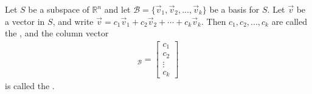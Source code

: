 \documentclass{article}
\begin{document}
\begin{definition}
    Let $S$ be a subspace of $\mathbb{R}^n$ and let $\mathcal{B}=\{\vec v_1, \vec v_2, ..., \vec v_k\}$ be a basis for $S$. Let $\vec v$ be a vector in $S$, and write $\vec v = c_1\vec v_1 + c_2\vec v_2 + \cdots + c_k\vec v_k$. Then $c_1, c_2, ..., c_k$ are called the , and the column vector
    \begin{gather*}
        [\vec v]_\mathcal{B} = \begin{bmatrix}
            c_1\\c_2\\\vdots\\c_k
        \end{bmatrix}
    \end{gather*}
    is called the .
\end{definition}
\setcounter{subsection}{5}
\end{document}
